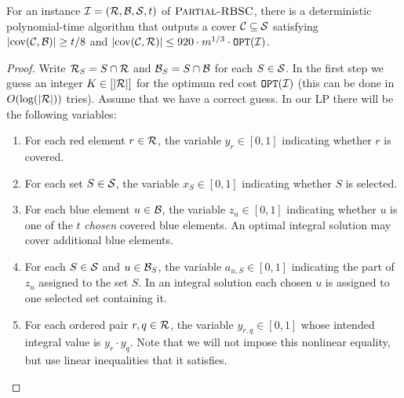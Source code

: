 \begin{theorem}\label{thm:partial-red-blue-bicriteria}
For an instance $\mathcal{I}=\mathopen{}\left( \mathcal{R},\mathcal{B},\mathcal{S},t \right)$ of $\textup{\textsc{Partial-RBSC}}$, there is a deterministic polynomial-time algorithm that outputs a cover $\mathcal{C}\subseteq\mathcal{S}$ satisfying $\mathopen{}\left| \operatorname{cov}\mathopen{}\left( \mathcal{C},\mathcal{B} \right) \right|\geq t/8$ and $\mathopen{}\left| \operatorname{cov}\mathopen{}\left( \mathcal{C},\mathcal{R} \right) \right|\leq920\cdot m^{1/3}\cdot\texttt{OPT}\mathopen{}\left( \mathcal{I} \right)$.
\end{theorem}
\begin{proof}
Write $\mathcal{R}_S=S\cap\mathcal{R}$ and $\mathcal{B}_S=S\cap\mathcal{B}$ for each $S\in\mathcal{S}$.
In the first step we guess an integer $K\in[\mathopen{}\left| \mathcal{R} \right|]$ for the optimum red cost $\texttt{OPT}\mathopen{}\left( \mathcal{I} \right)$ (this can be done in $O\mathopen{}\left( \log\mathopen{}\left( \mathopen{}\left| \mathcal{R} \right| \right) \right)$ tries). Assume that we have a correct guess. In our LP there will be the following variables:
\begin{enumerate}
    \item For each red element $r\in\mathcal{R}$, the variable $y_r\in[0,1]$ indicating whether $r$ is covered.
    \item For each set $S\in\mathcal{S}$, the variable $x_S\in[0,1]$ indicating whether $S$ is selected.
    \item For each blue element $u\in\mathcal{B}$, the variable $z_u\in[0,1]$ indicating whether $u$ is one of the $t$ \emph{chosen} covered blue elements. An optimal integral solution may cover additional blue elements.
    \item For each $S\in\mathcal{S}$ and $u\in\mathcal{B}_S$, the variable $a_{u,S}\in[0,1]$ indicating the part of $z_u$ assigned to the set $S$. In an integral solution each chosen $u$  is assigned to one selected set containing it.
    \item For each ordered pair $r,q\in\mathcal{R}$, the variable $y_{r,q}\in[0,1]$ whose intended integral value is $y_r\cdot y_q$. Note that we will not impose this nonlinear equality, but use linear inequalities that it satisfies.
\end{enumerate}


\end{proof}
